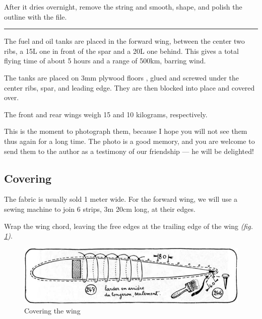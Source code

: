 \documentclass{book}
\newcommand*\circled[1]{\tikz[baseline=(char.base)]{
    \node[shape=circle,draw,inner sep=0.15pt] (char) {\footnotesize#1};}}
\newcommand*\sectline{
  \vspace{5pt}
  \begin{center}
    \rule{0.5\linewidth}{\linethickness}
  \end{center}
  \vspace{5pt}
}
\begin{document}
After it dries overnight, remove the string and smooth, shape, and
polish the outline with the file.

\sectline

The fuel and oil tanks are placed in the forward wing, between the
center two ribs, a 15L one in front of the spar and a 20L one behind.
This gives a total flying time of about 5 hours and a range of 500km,
barring wind.

The tanks are placed on 3mm plywood floors \circled{245}, glued and
screwed under the center ribs, spar, and leading edge.  They are then
blocked into place and covered over.

The front and rear wings weigh 15 and 10 kilograms, respectively.

This is the moment to photograph them, because I hope you will not see
them thus again for a long time.  The photo is a good memory, and you
are welcome to send them to the author as a testimony of our
friendship --- he will be delighted!

\subsection{Covering}

The fabric is usually sold 1 meter wide.  For the forward wing, we
will use a sewing machine to join 6 strips, 3m 20cm long, at their
edges.

Wrap the wing chord, leaving the free edges at the trailing edge of
the wing \textit{(fig. \ref{fig:fortyeight})}.

\begin{figure}
  \includegraphics[width=\linewidth]{fig-48.jpg}
  \caption{Covering the wing}
  \label{fig:fortyeight}
\end{figure}
\end{document}

